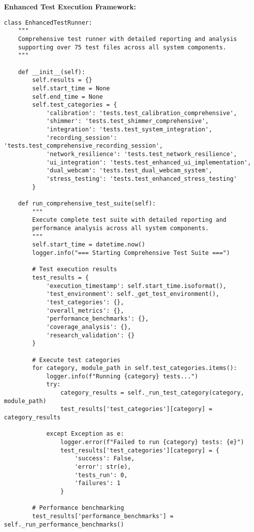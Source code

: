 \documentclass[11pt,a4paper]{article}
\begin{document}
\textbf{Enhanced Test Execution Framework:}

\begin{verbatim}
class EnhancedTestRunner:
    """
    Comprehensive test runner with detailed reporting and analysis
    supporting over 75 test files across all system components.
    """

    def __init__(self):
        self.results = {}
        self.start_time = None
        self.end_time = None
        self.test_categories = {
            'calibration': 'tests.test_calibration_comprehensive',
            'shimmer': 'tests.test_shimmer_comprehensive',
            'integration': 'tests.test_system_integration',
            'recording_session': 'tests.test_comprehensive_recording_session',
            'network_resilience': 'tests.test_network_resilience',
            'ui_integration': 'tests.test_enhanced_ui_implementation',
            'dual_webcam': 'tests.test_dual_webcam_system',
            'stress_testing': 'tests.test_enhanced_stress_testing'
        }

    def run_comprehensive_test_suite(self):
        """
        Execute complete test suite with detailed reporting and
        performance analysis across all system components.
        """
        self.start_time = datetime.now()
        logger.info("=== Starting Comprehensive Test Suite ===")

        # Test execution results
        test_results = {
            'execution_timestamp': self.start_time.isoformat(),
            'test_environment': self._get_test_environment(),
            'test_categories': {},
            'overall_metrics': {},
            'performance_benchmarks': {},
            'coverage_analysis': {},
            'research_validation': {}
        }

        # Execute test categories
        for category, module_path in self.test_categories.items():
            logger.info(f"Running {category} tests...")
            try:
                category_results = self._run_test_category(category, module_path)
                test_results['test_categories'][category] = category_results

            except Exception as e:
                logger.error(f"Failed to run {category} tests: {e}")
                test_results['test_categories'][category] = {
                    'success': False,
                    'error': str(e),
                    'tests_run': 0,
                    'failures': 1
                }

        # Performance benchmarking
        test_results['performance_benchmarks'] = self._run_performance_benchmarks()


\end{verbatim}
\end{document}

